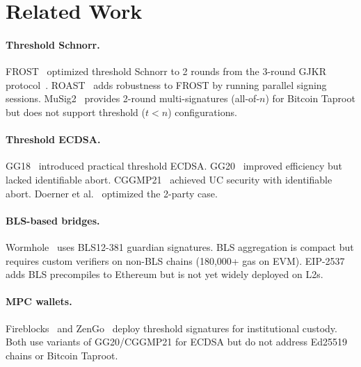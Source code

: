 \section{Related Work}

\label{sec:related}

\paragraph{Threshold Schnorr.}
FROST~\cite{komlo2020frost} optimized threshold Schnorr to 2 rounds from the 3-round
GJKR protocol~\cite{gennaro2003}. ROAST~\cite{ruffing2022roast} adds robustness to
FROST by running parallel signing sessions. MuSig2~\cite{nick2021musig2} provides
2-round multi-signatures (all-of-$n$) for Bitcoin Taproot but does not support
threshold ($t < n$) configurations.

\paragraph{Threshold ECDSA.}
GG18~\cite{gennaro2018} introduced practical threshold ECDSA.
GG20~\cite{gennaro2020} improved efficiency but lacked identifiable abort.
CGGMP21~\cite{canetti2021cggmp} achieved UC security with identifiable abort.
Doerner et al.~\cite{doerner2018} optimized the 2-party case.

\paragraph{BLS-based bridges.}
Wormhole~\cite{wormhole2023} uses BLS12-381 guardian signatures. BLS aggregation is
compact but requires custom verifiers on non-BLS chains (180,000+ gas on EVM). EIP-2537
adds BLS precompiles to Ethereum but is not yet widely deployed on L2s.

\paragraph{MPC wallets.}
Fireblocks~\cite{fireblocks2023} and ZenGo~\cite{zengo2019} deploy threshold
signatures for institutional custody. Both use variants of GG20/CGGMP21 for ECDSA but
do not address Ed25519 chains or Bitcoin Taproot.

